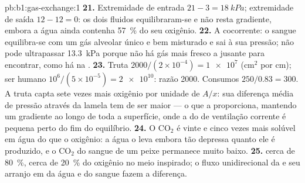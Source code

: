 \begin{solution}{pb:b1:gas-exchange:1}
\textbf{21.} Extremidade de entrada $21 - 3 = \qty{18}{kPa}$;
extremidade de saída $12 - 12 =
0$: os dois fluidos equilibraram-se e não resta gradiente, embora a
água ainda contenha \qty{57}{\%} do seu oxigênio.
\textbf{22.} A cocorrente: o sangue equilibra-se com um gás alveolar
único e bem misturado e sai à sua pressão; não pode ultrapassar
\qty{13.3}{kPa} porque não há gás mais fresco a jusante para
encontrar, como há na .
\textbf{23.} Truta $2000/(2\times 10^{-4}) = \num{1e7}$ (cm$^2$ por cm);
ser humano $10^6/(5\times 10^{-5}) = \num{2e10}$: razão \num{2000}.
Consumos $250/0.83 = 300$. A truta capta sete vezes mais oxigênio por
unidade de $A/x$: sua diferença média de pressão através da lamela tem
de ser maior --- o que a  proporciona, mantendo um
gradiente ao longo de toda a superfície, onde a do  de
ventilação corrente é pequena perto do fim do equilíbrio.
\textbf{24.} O $\mathrm{CO_2}$ é vinte e cinco vezes mais solúvel em
água do que o oxigênio: a água o leva embora tão depressa quanto ele é
produzido, e o $\mathrm{CO_2}$ do sangue de um peixe permanece muito
baixo.
\textbf{25.}  cerca de \qty{80}{\%},  cerca de
\qty{20}{\%} do oxigênio no meio inspirado; o fluxo unidirecional da
 e seu arranjo em  da água e do sangue fazem a
diferença.
\end{solution}
